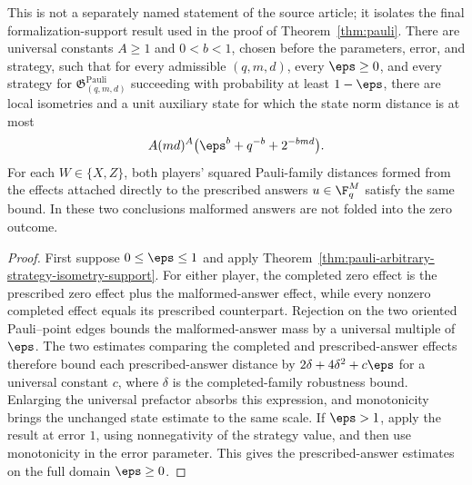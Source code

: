 \begin{theorem}
  \label{thm:pauli-arbitrary-strategy-raw-isometry-support}
  \leanok
  This is not a separately named statement of the source article; it isolates
  the final formalization-support result used in the proof of
  Theorem~\ref{thm:pauli}. There are universal constants $A\geq1$ and
  $0<b<1$, chosen before the parameters, error, and strategy, such that for
  every admissible $(q,m,d)$, every $\eps\geq0$, and every strategy for
  $\mathfrak{G}^{\mathrm{Pauli}}_{(q,m,d)}$ succeeding with probability at
  least $1-\eps$, there are local isometries and a unit auxiliary state for
  which the state norm distance is at most
  \[
    A(md)^A\bigl(\eps^b+q^{-b}+2^{-bmd}\bigr).
  \]
  For each $W\in\{X,Z\}$, both players' squared Pauli-family distances formed
  from the effects attached directly to the prescribed answers
  $u\in\F_q^M$ satisfy the same bound. In these two conclusions malformed
  answers are not folded into the zero outcome.
\end{theorem}
\begin{proof}
  \leanok
  First suppose $0\leq\eps\leq1$ and apply
  Theorem~\ref{thm:pauli-arbitrary-strategy-isometry-support}. For either
  player, the completed zero effect is the prescribed zero effect plus the
  malformed-answer effect, while every nonzero completed effect equals its
  prescribed counterpart. Rejection on the two oriented Pauli--point edges
  bounds the malformed-answer mass by a universal multiple of $\eps$. The two
  estimates comparing the completed and prescribed-answer effects therefore
  bound each prescribed-answer distance by
  $2\delta+4\delta^2+c\eps$ for a universal constant $c$, where $\delta$ is the
  completed-family robustness bound. Enlarging the universal prefactor absorbs
  this expression, and monotonicity brings the unchanged state estimate to the
  same scale. If $\eps>1$, apply the result at error $1$, using nonnegativity of
  the strategy value, and then use monotonicity in the error parameter. This
  gives the prescribed-answer estimates on the full domain $\eps\geq0$.
\end{proof}

